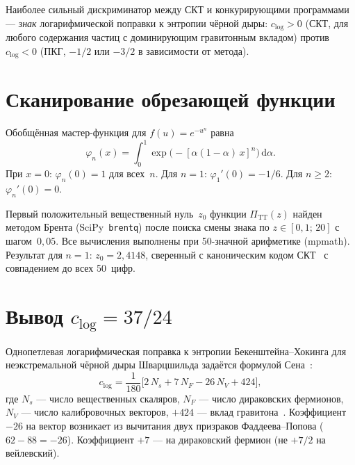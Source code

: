 \documentclass[12pt,a4paper]{article}
\theoremstyle{plain}
\theoremstyle{definition}
\theoremstyle{remark}
\newcommand{\dd}{\mathrm{d}}
\begin{document}
Наиболее сильный дискриминатор между СКТ и конкурирующими
программами --- \emph{знак} логарифмической поправки к энтропии
чёрной дыры: $c_{\log} > 0$ (СКТ, для любого содержания частиц
с доминирующим гравитонным вкладом) против $c_{\log} < 0$
(ПКГ, $-1/2$ или $-3/2$ в зависимости от метода).

\appendix
\section{Сканирование обрезающей функции}
\label{app:cutoff}

Обобщённая мастер-функция для $f(u) = e^{-u^n}$ равна
\begin{equation}\label{eq:phi-n-app}
  \varphi_n(x) = \int_0^1
  \exp\bigl(-[\alpha(1-\alpha)\, x]^n\bigr)\, \dd\alpha.
\end{equation}
При $x = 0$: $\varphi_n(0) = 1$ для всех~$n$. Для $n = 1$:
$\varphi_1'(0) = -1/6$. Для $n \geq 2$: $\varphi_n'(0) = 0$.

Первый положительный вещественный нуль~$z_0$ функции
$\Pi_{\mathrm{TT}}(z)$ найден методом Брента
(SciPy~\texttt{brentq}) после поиска смены знака по
$z \in [0{,}1;\, 20]$ с шагом~$0{,}05$. Все вычисления
выполнены при 50-значной арифметике (mpmath). Результат для $n = 1$:
$z_0 = 2{,}4148$, сверенный с каноническим кодом
СКТ~\cite{Alfyorov:2026repo} с совпадением до всех 50~цифр.

\section{Вывод $c_{\log} = 37/24$}
\label{app:clog}

Однопетлевая логарифмическая поправка к энтропии
Бекенштейна--Хокинга для неэкстремальной чёрной дыры
Шварцшильда задаётся формулой Сена~\cite{Sen:2012}:
\begin{equation}\label{eq:sen-formula}
  c_{\log} = \frac{1}{180}\bigl[
  2\,N_s + 7\,N_F - 26\,N_V + 424\bigr],
\end{equation}
где $N_s$ --- число вещественных скаляров, $N_F$ --- число
дираковских фермионов, $N_V$ --- число калибровочных векторов,
$+424$ --- вклад гравитона~\cite{Sen:2012}.
Коэффициент $-26$ на вектор возникает из вычитания двух
призраков Фаддеева--Попова ($62 - 88 = -26$). Коэффициент
$+7$ --- на дираковский фермион (не $+7/2$ на вейлевский).
\end{document}
